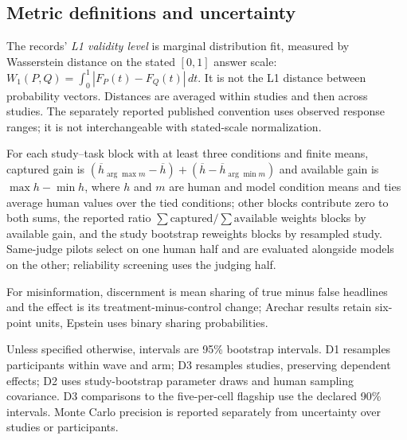 \documentclass[11pt]{article}
\begin{document}
\subsection{Metric definitions and uncertainty}\label{app:metrics}
The records' \emph{L1 validity level} is marginal distribution fit, measured by Wasserstein distance on the stated $[0,1]$ answer scale: $W_1(P,Q)=\int_0^1|F_P(t)-F_Q(t)|\,dt$. It is not the L1 distance between probability vectors. Distances are averaged within studies and then across studies. The separately reported published convention uses observed response ranges; it is not interchangeable with stated-scale normalization.

For each study--task block with at least three conditions and finite means, captured gain is $(\overline h_{\arg\max m}-\overline h)+(\overline h-\overline h_{\arg\min m})$ and available gain is $\max h-\min h$, where $h$ and $m$ are human and model condition means and ties average human values over the tied conditions; other blocks contribute zero to both sums, the reported ratio $\sum\mathrm{captured}/\sum\mathrm{available}$ weights blocks by available gain, and the study bootstrap reweights blocks by resampled study. Same-judge pilots select on one human half and are evaluated alongside models on the other; reliability screening uses the judging half.

For misinformation, discernment is mean sharing of true minus false headlines and the effect is its treatment-minus-control change; Arechar results retain six-point units, Epstein uses binary sharing probabilities.

Unless specified otherwise, intervals are 95\% bootstrap intervals. D1 resamples participants within wave and arm; D3 resamples studies, preserving dependent effects; D2 uses study-bootstrap parameter draws and human sampling covariance. D3 comparisons to the five-per-cell flagship use the declared 90\% intervals. Monte Carlo precision is reported separately from uncertainty over studies or participants.
\end{document}
